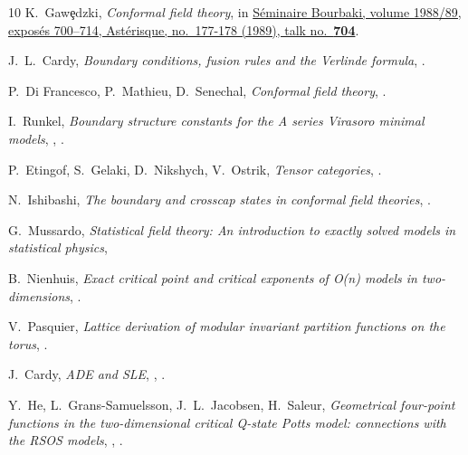 \documentclass[11pt,a4paper]{article}
\numberwithin{equation}{section}
\begin{document}
\begin{thebibliography}{10}
K.~Gaw\c{e}dzki, 
{\it Conformal field theory}, in
\href{http://www.numdam.org/item/SB_1988-1989__31__95_0}{
Séminaire Bourbaki, volume 1988/89, exposés 700--714, Astérisque, no.\ 177-178 (1989), talk no.\ {\bf 704}}.

J.~L.~Cardy,
{\it Boundary conditions, fusion rules and the Verlinde formula},
.

P.~Di Francesco, P.~Mathieu, D.~Senechal,
\textit{Conformal field theory},
.

I.~Runkel,
\textit{Boundary structure constants for the A series Virasoro minimal models},
,
.

P.~Etingof, S.~Gelaki, D.~Nikshych, V.~Ostrik,
\textsl{Tensor categories},
.

N.~Ishibashi,
\textit{The boundary and crosscap states in conformal field theories},
.

G.~Mussardo,
\textit{Statistical field theory: An introduction to exactly solved models in statistical physics}, 

B.~Nienhuis,
\textit{Exact critical point and critical exponents of O(n) models in two-dimensions},
.

V.~Pasquier,
\textit{Lattice derivation of modular invariant partition functions on the torus},
.

J.~Cardy,
\textit{ADE and SLE},
,
.

Y.~He, L.~Grans-Samuelsson, J.~L.~Jacobsen, H.~Saleur,
\textit{Geometrical four-point functions in the two-dimensional critical Q-state Potts model: connections with the RSOS models},
,
.


\end{thebibliography}
\end{document}
